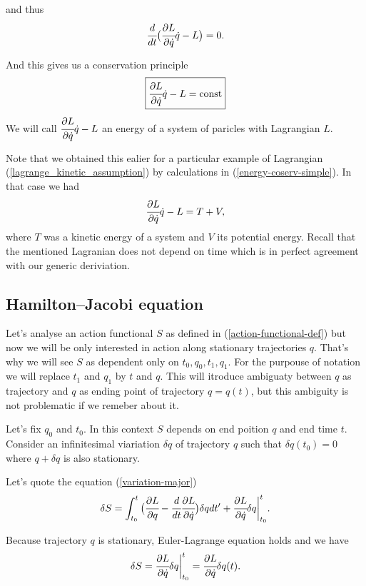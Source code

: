 \documentclass[main.tex]{subfiles}
\begin{document}
and thus
\begin{equation}
\cfrac{d}{dt} \big( \cfrac{\partial L}{\partial \dot{q}}\dot{q} - L \big) = 0.
\end{equation}
 
And this gives us a conservation principle
\begin{equation}
\boxed{
\cfrac{\partial L}{\partial \dot{q}}\dot{q} - L = \text{const}
}
\end{equation}
We will call $\cfrac{\partial L}{\partial \dot{q}}\dot{q} - L$ an energy of a system of paricles with Lagrangian $L$.

Note that we obtained this ealier for a particular example of Lagrangian (\ref{lagrange_kinetic_assumption})
by calculations in (\ref{energy-coserv-simple}). In that case we had
\begin{equation}
\cfrac{\partial L}{\partial \dot{q}}\dot{q} - L = T + V,
\end{equation}
where $T$ was a kinetic energy of a system and $V$ its potential energy.
Recall that the mentioned Lagranian does not depend on time which is in perfect agreement with our generic deriviation.

\subsection{Hamilton–Jacobi equation}
Let's analyse an action functional $S$ as defined in (\ref{action-functional-def}) but now we will be only interested in action along stationary trajectories $q$. That's why we will see $S$ as dependent only on $t_0, q_0, t_1, q_1$. For the purpouse of notation we will replace $t_1$ and $q_1$ by $t$ and $q$. This will itroduce ambiguaty between $q$ as trajectory and $q$ as ending point of trajectory $q=q(t)$, but this ambiguity is not problematic if we remeber about it.

Let's fix $q_0$ and $t_0$. In this context $S$ depends on end poition $q$ and end time $t$. Consider an infinitesimal viariation $\delta q$ of trajectory $q$ such that $\delta q(t_0) = 0$ where $q + \delta q$ is also stationary.

Let's quote the equation (\ref{variation-major})
\begin{equation}
\delta S = \int_{t_0}^{t} \big(\cfrac{\partial L}{\partial q} - \cfrac{d}{dt} \cfrac{\partial L}{\partial \dot{q}}\big)\delta qdt' + \cfrac{\partial L}{\partial \dot{q}} \delta q \bigg|^{t}_{t_0}.
\end{equation}

Because trajectory $q$ is stationary, Euler-Lagrange equation holds and we have
\begin{equation}
\delta S = \cfrac{\partial L}{\partial \dot{q}} \delta q \bigg|^{t}_{t_0} = \cfrac{\partial L}{\partial \dot{q}} \delta q(t).
\end{equation} 
\end{document}
